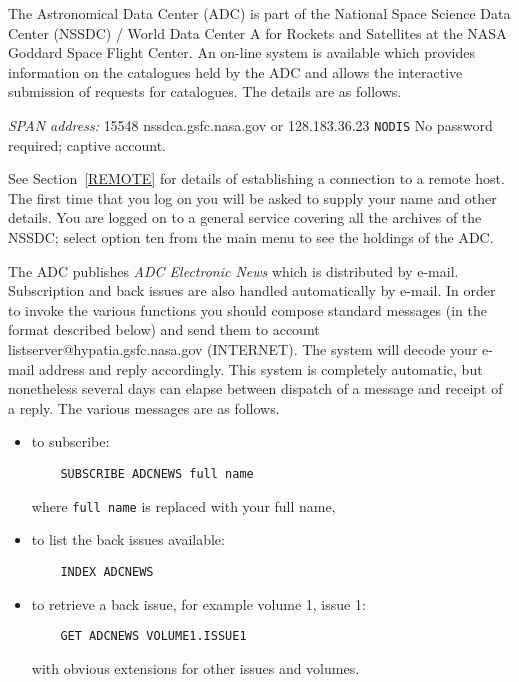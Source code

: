 \documentclass[twoside,11pt]{article}
\begin{document}
The Astronomical Data Center (ADC) is part of the National Space
Science Data Center (NSSDC) / World Data Center A for Rockets and 
Satellites at the NASA Goddard Space Flight Center. An on-line system
is available which provides information on the catalogues held by the
ADC and allows the interactive submission of requests for catalogues.
The details are as follows.

{\it SPAN address: } 15548
 nssdca.gsfc.nasa.gov or 128.183.36.23
 \verb-NODIS-
 No password required; captive account.

See Section~\ref{REMOTE} for details of establishing a connection to
a remote host. The first time that you log on you will
be asked to supply your name and other details. You are logged on to a
general service covering all the archives of the NSSDC; select option 
ten from the main menu to see the holdings of the ADC.

The ADC publishes {\it ADC Electronic News} which is distributed by
e-mail. Subscription and back issues are also handled automatically by 
e-mail. In order to invoke the various functions you should compose 
standard messages (in the format described below) and send them to 
account listserver@hypatia.gsfc.nasa.gov (INTERNET). The system will
decode your e-mail address and reply accordingly. This system is 
completely automatic, but nonetheless several days can elapse between
dispatch of a message and receipt of a reply. The various messages are 
as follows.

\begin{itemize}

  \item to subscribe:
  \begin{verbatim}
    SUBSCRIBE ADCNEWS full name
  \end{verbatim}

   where \verb-full name- is replaced with your full name,

  \item to list the back issues available:
  \begin{verbatim}
    INDEX ADCNEWS
  \end{verbatim}

  \item to retrieve a back issue, for example volume 1, issue 1:
  \begin{verbatim}
    GET ADCNEWS VOLUME1.ISSUE1
  \end{verbatim}

   with obvious extensions for other issues and volumes.

\end{itemize}
\end{document}
